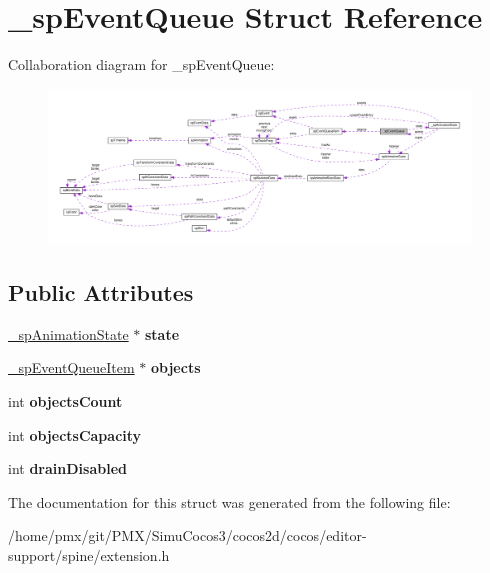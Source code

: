 \hypertarget{struct__spEventQueue}{}\section{\+\_\+sp\+Event\+Queue Struct Reference}
\label{struct__spEventQueue}


Collaboration diagram for \+\_\+sp\+Event\+Queue\+:
\nopagebreak
\begin{figure}[H]
\begin{center}
\leavevmode
\includegraphics[width=350pt]{struct__spEventQueue__coll__graph}
\end{center}
\end{figure}
\subsection*{Public Attributes}
\begin{DoxyCompactItemize}
\item 
\mbox{\label{struct__spEventQueue_a9610f680183b61ccfa232fbf1d895079}} 
\hyperlink{struct__spAnimationState}{\+\_\+sp\+Animation\+State} $\ast$ {\bfseries state}
\item 
\mbox{\label{struct__spEventQueue_a8b9a49759a7ebdf26b133d7740e85077}} 
\hyperlink{union__spEventQueueItem}{\+\_\+sp\+Event\+Queue\+Item} $\ast$ {\bfseries objects}
\item 
\mbox{\label{struct__spEventQueue_a5ccefa9c230c046ffba1ee336b1239c1}} 
int {\bfseries objects\+Count}
\item 
\mbox{\label{struct__spEventQueue_ac58b13c6611f46ac61af1d842cff13cb}} 
int {\bfseries objects\+Capacity}
\item 
\mbox{\label{struct__spEventQueue_a6a8a7cff62188bff0a27c70b652a76da}} 
int {\bfseries drain\+Disabled}
\end{DoxyCompactItemize}


The documentation for this struct was generated from the following file\+:\begin{DoxyCompactItemize}
\item 
/home/pmx/git/\+P\+M\+X/\+Simu\+Cocos3/cocos2d/cocos/editor-\/support/spine/extension.\+h\end{DoxyCompactItemize}
